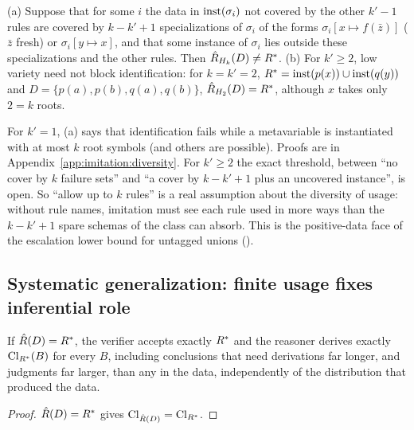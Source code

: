 \begin{proposition}\label{prop:imitation:diversity}
\textup{(a)} Suppose that for some $i$ the data in $\mathrm{inst}(\sigma_i)$ not covered by the other $k'-1$ rules are covered by $k-k'+1$ specializations of $\sigma_i$ of the forms $\sigma_i[x\mapsto f(\bar z)]$ ($\bar z$ fresh) or $\sigma_i[y\mapsto x]$, and that some instance of $\sigma_i$ lies outside these specializations and the other rules. Then $\hat R_{H_k}(D)\neq R^{*}$.
\textup{(b)} For $k'\ge2$, low variety need not block identification: for $k=k'=2$, $R^{*}=\mathrm{inst}(p(x))\cup\mathrm{inst}(q(y))$ and $D=\{p(a),p(b),q(a),q(b)\}$, $\hat R_{H_2}(D)=R^{*}$, although $x$ takes only $2=k$ roots.
\end{proposition}

For $k'=1$, (a) says that identification fails while a metavariable is instantiated with at most $k$ root symbols (and others are possible). Proofs are in Appendix~\ref{app:imitation:diversity}. For $k'\ge2$ the exact threshold, between ``no cover by $k$ failure sets'' and ``a cover by $k-k'+1$ plus an uncovered instance'', is open. So ``allow up to $k$ rules'' is a real assumption about the diversity of usage: without rule names, imitation must see each rule used in more ways than the $k-k'+1$ spare schemas of the class can absorb. This is the positive-data face of the escalation lower bound for untagged unions ().

\subsection{Systematic generalization: finite usage fixes inferential role}\label{sec:imitation:ood}

\begin{corollary}\label{cor:imitation:ood}
If $\hat R(D)=R^{*}$, the verifier accepts exactly $R^{*}$ and the reasoner derives exactly $\mathrm{Cl}_{R^{*}}(B)$ for every $B$, including conclusions that need derivations far longer, and judgments far larger, than any in the data, independently of the distribution that produced the data.
\end{corollary}

\begin{proof}
$\hat R(D)=R^{*}$ gives $\mathrm{Cl}_{\hat R(D)}=\mathrm{Cl}_{R^{*}}$.
\end{proof}

